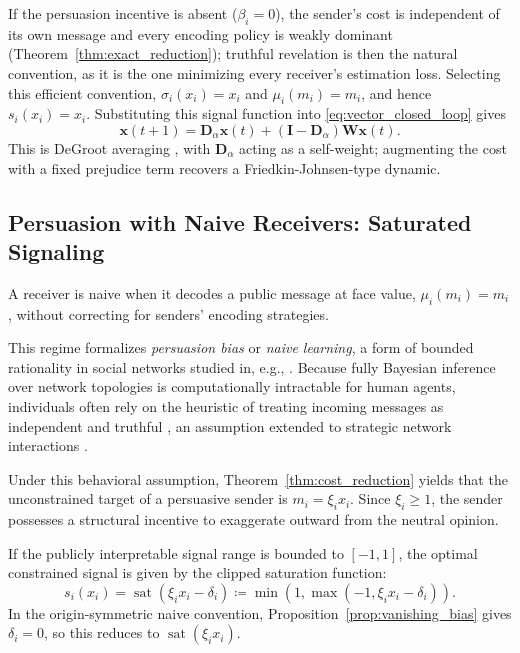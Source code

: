 \documentclass[journal,twoside,web]{ieeecolor}
\begin{document}
If the persuasion incentive is absent ($\beta_i=0$), the sender's cost is independent of its own message and every encoding policy is weakly dominant (Theorem~\ref{thm:exact_reduction}); truthful revelation is then the natural convention, as it is the one minimizing every receiver's estimation loss. Selecting this efficient convention, $\sigma_i(x_i)=x_i$ and $\mu_i(m_i)=m_i$, and hence $s_i(x_i)=x_i$.
Substituting this signal function into \eqref{eq:vector_closed_loop} gives
\[
    \bm x(t+1)
    =
    \bm D_\alpha\bm x(t)
    +(\bm I-\bm D_\alpha)\bm W\bm x(t).
\]
This is DeGroot averaging \cite{degroot1974}, with $\bm D_\alpha$ acting as a self-weight; augmenting the cost with a fixed prejudice term recovers a Friedkin-Johnsen-type \cite{friedkin1990} dynamic.

\subsection{Persuasion with Naive Receivers: Saturated Signaling}
\label{subsec:saturated_signaling}
A receiver is naive when it decodes a public message at face value, $\mu_i(m_i)=m_i$, without correcting for senders' encoding strategies.

This regime formalizes \emph{persuasion bias} or \emph{naive learning}, a form of bounded rationality in social networks studied in, e.g., \cite{demarzo2003persuasion, golub2010naive}. Because fully Bayesian inference over network topologies is computationally intractable for human agents, individuals often rely on the heuristic of treating incoming messages as independent and truthful \cite{demarzo2003persuasion}, an assumption extended to strategic network interactions \cite{forster2016trust}.

Under this behavioral assumption, Theorem~\ref{thm:cost_reduction} yields that the unconstrained target of a persuasive sender is $m_i=\xi_i x_i$. Since $\xi_i\ge 1$, the sender possesses a structural incentive to exaggerate outward from the neutral opinion.

If the publicly interpretable signal range is bounded to $[-1,1]$, the optimal constrained signal is given by the clipped saturation function:
\begin{equation}
    \label{eq:saturated_target}
    s_i(x_i)
    =
    \operatorname{sat}(\xi_i x_i-\delta_i)
    \coloneqq
    \min(1,\max(-1,\xi_i x_i-\delta_i)).
\end{equation}
In the origin-symmetric naive convention, Proposition~\ref{prop:vanishing_bias} gives $\delta_i=0$, so this reduces to $\operatorname{sat}(\xi_i x_i)$.
\end{document}
